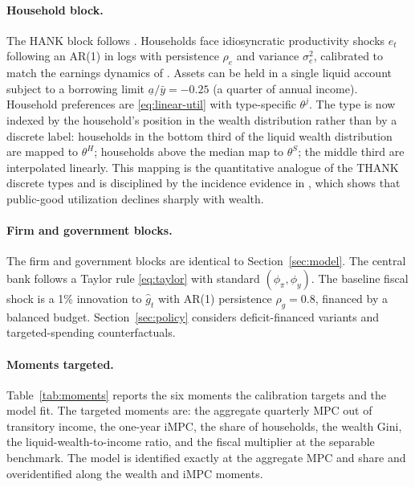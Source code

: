 \paragraph{Household block.}
The HANK block follows \citet{KaplanMollViolante2018}. Households face
idiosyncratic productivity shocks $e_{t}$ following an AR(1) in logs with
persistence $\rho_{e}$ and variance $\sigma_{e}^{2}$, calibrated to match the
earnings dynamics of \citet{FloodenLinde2001}. Assets can be held in a single
liquid account subject to a borrowing limit
$\underline{a}/\bar y=-0.25$ (a quarter of annual income). Household preferences
are \eqref{eq:linear-util} with type-specific $\theta^{j}$. The type is now
indexed by the household's position in the wealth distribution rather than by
a discrete label: households in the bottom third of the liquid wealth
distribution are mapped to $\theta^{H}$; households above the median map to
$\theta^{S}$; the middle third are interpolated linearly. This mapping is the
quantitative analogue of the THANK discrete types and is disciplined by the
incidence evidence in \citet{Gethin2023}, which shows that public-good
utilization declines sharply with wealth.

\paragraph{Firm and government blocks.}
The firm and government blocks are identical to Section~\ref{sec:model}. The
central bank follows a Taylor rule \eqref{eq:taylor} with standard
$(\phi_{\pi},\phi_{y})$. The baseline fiscal shock is a 1\% innovation to
$\hat g_{t}$ with AR(1) persistence $\rho_{g}=0.8$, financed by a balanced
budget. Section~\ref{sec:policy} considers deficit-financed variants and
targeted-spending counterfactuals.

\paragraph{Moments targeted.}
Table~\ref{tab:moments} reports the six moments the calibration targets and the
model fit. The targeted moments are: the aggregate quarterly MPC out of
transitory income, the one-year iMPC, the share of \HtM{} households, the
wealth Gini, the liquid-wealth-to-income ratio, and the fiscal multiplier at
the separable benchmark. The model is identified exactly at the aggregate MPC
and \HtM{} share and overidentified along the wealth and iMPC moments.

